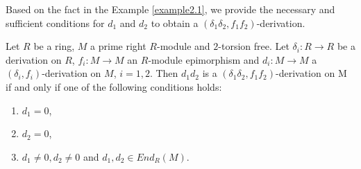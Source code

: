 \documentclass{arxiv}
\begin{document}
Based on the fact in the Example \ref{example2.1}, we provide the necessary and sufficient conditions for $d_1$ and $d_2$ to obtain a $(\delta_1\delta_2,f_1f_2)$-derivation.
\begin{theorem}\label{teo3.1.1}
    Let $R$ be a ring, $M$ a prime right $R$-module and $2$-torsion free. Let $\delta_i : R \rightarrow R$ be a derivation on $R$, $f_i: M \rightarrow M$ an $R$-module epimorphism and $d_i:M \rightarrow M$ a $(\delta_i,f_i)$-derivation on $M$, $i=1,2$. Then $d_1d_2$ is a $(\delta_1\delta_2,f_1f_2)$-derivation on M  if and only if one of the following conditions holds:
    \begin{enumerate}
        \item $d_1 = 0$,
        \item $d_2 = 0$,
        \item $d_1 \ne 0, d_2 \ne 0$ and $d_1,d_2 \in End_R(M)$.
    \end{enumerate}
\end{theorem}
\end{document}
